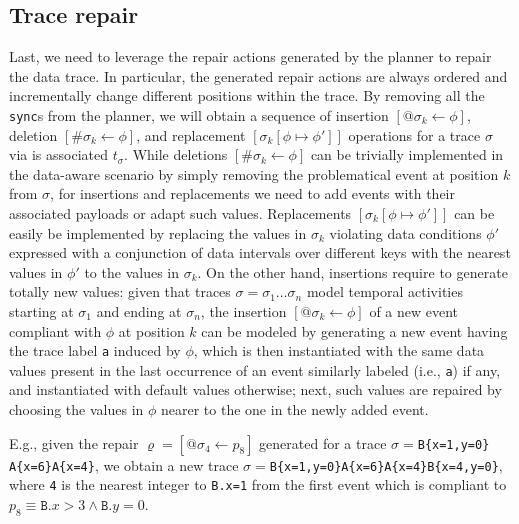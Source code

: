\subsection{Trace repair}\label{ssec:trerepair}
Last, we need to leverage the repair actions generated by the planner to repair the data trace. In particular, the generated repair actions are always ordered and incrementally change different positions within the trace. By removing all the \texttt{sync}s from the planner, we will obtain a sequence of insertion $[@\sigma_k\leftarrow \phi]$, deletion $[\#\sigma_k\leftarrow \phi]$, and replacement $[\sigma_k[\phi\mapsto \phi']]$ operations for a trace $\sigma$ via is associated $t_\sigma$. While deletions $[\#\sigma_k\leftarrow \phi]$ can be trivially implemented in the data-aware scenario by simply removing the problematical event at position $k$ from $\sigma$, for insertions and replacements we need to add events with their associated payloads or adapt such values. Replacements $[\sigma_k[\phi\mapsto \phi']]$ can be easily be implemented by replacing the values in $\sigma_k$ violating data conditions $\phi'$ expressed with a conjunction of data intervals over different keys with the nearest values in $\phi'$ to the values in $\sigma_k$. On the other hand, insertions require to generate totally new values: given that traces $\sigma=\sigma_1\dots \sigma_n$ model temporal activities starting at $\sigma_1$ and ending at $\sigma_n$,  the insertion $[@\sigma_k\leftarrow \phi]$ of a new event compliant with $\phi$ at position $k$ can be modeled by generating a new event having the trace label \texttt{a} induced by $\phi$, which is then instantiated with the same data values present in the last occurrence of an event similarly labeled (i.e., \texttt{a}) if any, and instantiated with default values otherwise; next, such values are repaired by choosing the values in $\phi$ nearer to the one in the newly added event.

E.g., given the repair $\varrho=[@\sigma_4\leftarrow p_8]$ generated for a trace $\sigma=$\texttt{B\{x=1,y=0\}\\A\{x=6\}A\{x=4\}}, we obtain a new trace $\sigma=$\texttt{B\{x=1,y=0\}$  $A\{x=6\}A\{x=4\}B\{x=4,y=0\}}, where \texttt{4} is the nearest integer to \texttt{B.x=1} from the first event which is compliant to $p_8\equiv\texttt{B}.x>3\wedge \texttt{B}.y=0$. 